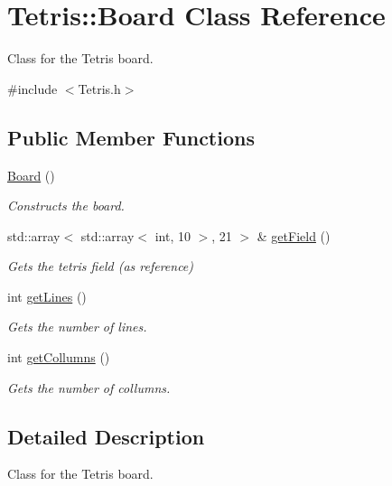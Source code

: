 \hypertarget{classTetris_1_1Board}{}\section{Tetris\+:\+:Board Class Reference}
\label{classTetris_1_1Board}


Class for the Tetris board.  




{\ttfamily \#include $<$Tetris.\+h$>$}

\subsection*{Public Member Functions}
\begin{DoxyCompactItemize}
\item 
\mbox{\label{classTetris_1_1Board_ad053f5e5e3f705196ee596e1b2a507e4}} 
\mbox{\hyperlink{classTetris_1_1Board_ad053f5e5e3f705196ee596e1b2a507e4}{Board}} ()
\begin{DoxyCompactList}\small\item\em Constructs the board. \end{DoxyCompactList}\item 
std\+::array$<$ std\+::array$<$ int, 10 $>$, 21 $>$ \& \mbox{\hyperlink{classTetris_1_1Board_acfeb8aabd83fecafeb5b912960ca7623}{get\+Field}} ()
\begin{DoxyCompactList}\small\item\em Gets the tetris field (as reference) \end{DoxyCompactList}\item 
int \mbox{\hyperlink{classTetris_1_1Board_a53a614c61a25dfb508ccb45f235bb3b5}{get\+Lines}} ()
\begin{DoxyCompactList}\small\item\em Gets the number of lines. \end{DoxyCompactList}\item 
int \mbox{\hyperlink{classTetris_1_1Board_abff7a1233d19e4044b7d4ff35a347087}{get\+Collumns}} ()
\begin{DoxyCompactList}\small\item\em Gets the number of collumns. \end{DoxyCompactList}\end{DoxyCompactItemize}


\subsection{Detailed Description}
Class for the Tetris board. 


